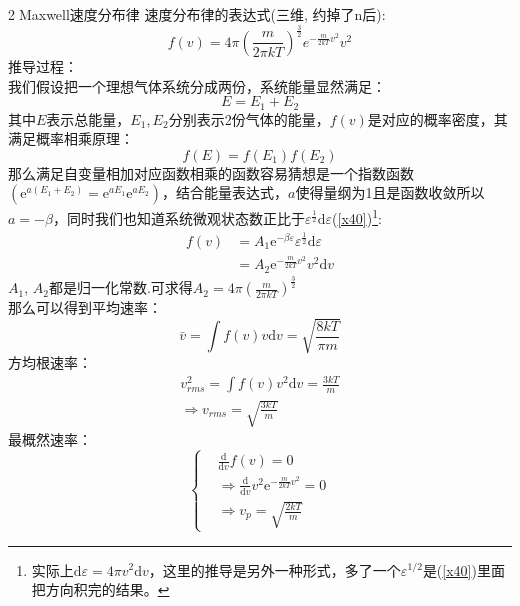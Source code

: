 \documentclass[12pt]{article}
\begin{document}
\noindent
\textcircled{2}Maxwell速度分布律
速度分布律的表达式(三维, 约掉了n后):
\begin{equation}
	f(v)=4\pi (\frac{m}{2\pi kT})^{\frac{3}{2}}e^{-\frac{m}{2kT}v^2}v^2
\end{equation}
推导过程：\\
我们假设把一个理想气体系统分成两份，系统能量显然满足：
\begin{equation}
	E=E_1+E_2
\end{equation}
其中$E$表示总能量，$E_1,E_2$分别表示2份气体的能量，$f(v)$是对应的概率密度，其满足概率相乘原理：
\begin{equation}
	f(E)=f(E_1)f(E_2)
\end{equation}
那么满足自变量相加对应函数相乘的函数容易猜想是一个指数函数$(\mathrm{e}^{a(E_1+E_2)}=\mathrm{e}^{aE_1}\mathrm{e}^{aE_2})$，结合能量表达式，$a$使得量纲为1且是函数收敛所以$a=-\beta$，同时我们也知道系统微观状态数正比于$\varepsilon^{\frac{1}{2}}\mathrm{d}\varepsilon$(\ref{x40})\footnote{实际上$\mathrm{d}\varepsilon=4\pi v^2\mathrm{d}v$，这里的推导是另外一种形式，多了一个$\varepsilon^{1/2}$是(\ref{x40})里面把方向积完的结果。}:
\begin{equation}
	\begin{split}
	f(v)&=A_1\mathrm{e}^{-\beta \varepsilon}\varepsilon^{\frac{1}{2}}\mathrm{d}\varepsilon\\
	&=A_2\mathrm{e}^{-\frac{m}{2kT}v^2}v^2\mathrm{d}v
\end{split}
\end{equation}
$A_1$, $A_2$都是归一化常数.可求得$A_2=4\pi (\frac{m}{2\pi kT})^{\frac{3}{2}}$\\
那么可以得到平均速率：
\begin{equation}
	\bar{v}=\int f(v)v\mathrm{d}v=\sqrt{\frac{8 kT}{\pi m}}
\end{equation}
方均根速率：
\begin{equation}
	\begin{split} 
	v_{rms}^2=\int f(v)v^2\mathrm{d}v=\frac{3kT}{m}\\
	\Rightarrow v_{rms}=\sqrt{\frac{3kT}{m}}
\end{split}
\end{equation}
最概然速率：
\begin{equation}
	\left\{
	\begin{split} 
	&\frac{\mathrm{d}}{\mathrm{d}v}f(v)=0\\
	&\Rightarrow \frac{\mathrm{d}}{\mathrm{d}v}v^2\mathrm{e}^{-\frac{m}{2kT}v^2}=0\\
	&\Rightarrow v_p=\sqrt{\frac{2kT}{m}}
\end{split}\right.
\end{equation}
\end{document}
